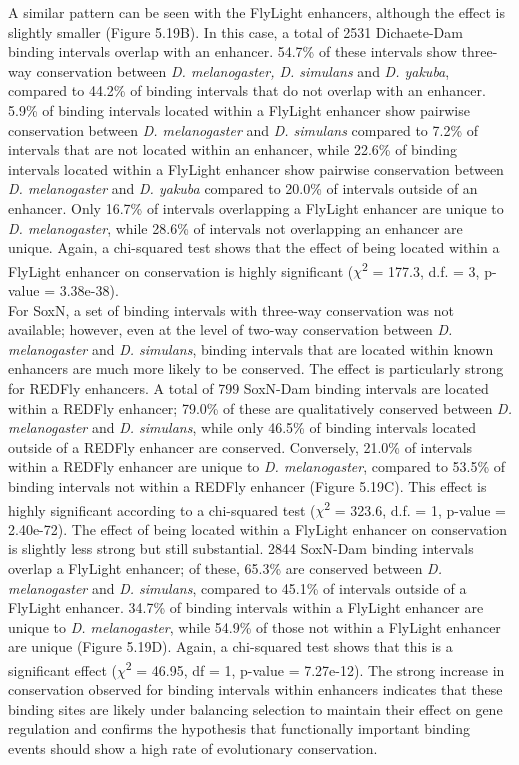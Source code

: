 A similar pattern can be seen with the FlyLight enhancers, although the effect is slightly smaller (Figure 5.19B). In this case, a total of 2531 Dichaete-Dam binding intervals overlap with an enhancer. 54.7\% of these intervals show three-way conservation between \emph{D. melanogaster, D. simulans} and \emph{D. yakuba}, compared to 44.2\% of binding intervals that do not overlap with an enhancer. 5.9\% of binding intervals located within a FlyLight enhancer show pairwise conservation between \emph{D. melanogaster} and \emph{D. simulans} compared to 7.2\% of intervals that are not located within an enhancer, while 22.6\% of binding intervals located within a FlyLight enhancer show pairwise conservation between \emph{D. melanogaster} and \emph{D. yakuba} compared to 20.0\% of intervals outside of an enhancer. Only 16.7\% of intervals overlapping a FlyLight enhancer are unique to \emph{D. melanogaster}, while 28.6\% of intervals not overlapping an enhancer are unique. Again, a chi-squared test shows that the effect of being located within a FlyLight enhancer on conservation is highly significant (\(\chi\)\textsuperscript{2} = 177.3, d.f. = 3, p-value = 3.38e-38).\\

For SoxN, a set of binding intervals with three-way conservation was not available; however, even at the level of two-way conservation between \emph{D. melanogaster} and \emph{D. simulans}, binding intervals that are located within known enhancers are much more likely to be conserved. The effect is particularly strong for REDFly enhancers. A total of 799 SoxN-Dam binding intervals are located within a REDFly enhancer; 79.0\% of these are qualitatively conserved between \emph{D. melanogaster} and \emph{D. simulans}, while only 46.5\% of binding intervals located outside of a REDFly enhancer are conserved. Conversely, 21.0\% of intervals within a REDFly enhancer are unique to \emph{D. melanogaster}, compared to 53.5\% of binding intervals not within a REDFly enhancer (Figure 5.19C). This effect is highly significant according to a chi-squared test (\(\chi\)\textsuperscript{2} = 323.6, d.f. = 1, p-value = 2.40e-72). The effect of being located within a FlyLight enhancer on conservation is slightly less strong but still substantial. 2844 SoxN-Dam binding intervals overlap a FlyLight enhancer; of these, 65.3\% are conserved between \emph{D. melanogaster} and \emph{D. simulans}, compared to 45.1\% of intervals outside of a FlyLight enhancer. 34.7\% of binding intervals within a FlyLight enhancer are unique to \emph{D. melanogaster}, while 54.9\% of those not within a FlyLight enhancer are unique (Figure 5.19D). Again, a chi-squared test shows that this is a significant effect (\(\chi\)\textsuperscript{2} = 46.95, df = 1, p-value = 7.27e-12). The strong increase in conservation observed for binding intervals within enhancers indicates that these binding sites are likely under balancing selection to maintain their effect on gene regulation and confirms the hypothesis that functionally important binding events should show a high rate of evolutionary conservation.


